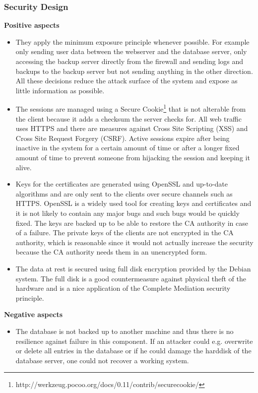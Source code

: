 \documentclass[english]{article}
\begin{document}
\subsubsection{Security Design}
\textbf{Positive aspects}
\begin{itemize}
\item They apply the minimum exposure principle whenever possible. For example only sending user data between the webserver and the database server, only accessing the backup server directly from the firewall and sending logs and backups to the backup server but not sending anything in the other direction. All these decisions reduce the attack surface of the system and expose as little information as possible.
\item The sessions are managed using a Secure Cookie\footnote{http://werkzeug.pocoo.org/docs/0.11/contrib/securecookie/} that is not alterable from the client because it adds a checksum the server checks for. All web traffic uses HTTPS and there are measures against Cross Site Scripting (XSS) and Cross Site Request Forgery (CSRF). Active sessions expire after being inactive in the system for a certain amount of time or after a longer fixed amount of time to prevent someone from hijacking the session and keeping it alive.
\item Keys for the certificates are generated using OpenSSL and up-to-date algorithms and are only sent to the clients over secure channels such as HTTPS. OpenSSL is a widely used tool for creating keys and certificates and it is not likely to contain any major bugs and such bugs would be quickly fixed. The keys are backed up to be able to restore the CA authority in case of a failure. The private keys of the clients are not encrypted in the CA authority, which is reasonable since it would not actually increase the security because the CA authority needs them in an unencrypted form.
\item The data at rest is secured using full disk encryption provided by the Debian system. The full disk is a good countermeasure against physical theft of the hardware and is a nice application of the Complete Mediation security principle.
\end{itemize}

\textbf{Negative aspects}
\begin{itemize}
\item The database is not backed up to another machine and thus there is no resilience against failure in this component. If an attacker could e.g. overwrite or delete all entries in the database or if he could damage the harddisk of the database server, one could not recover a working system.
\end{itemize}
\end{document}
